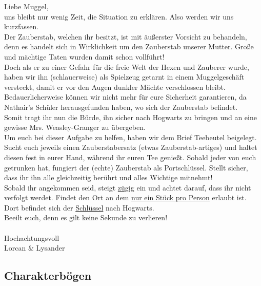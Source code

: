 \documentclass[]{scrartcl}
\begin{document}
{\calligra \large
	
Liebe Muggel,\\

uns bleibt nur wenig Zeit, die Situation zu erklären. Also werden wir uns kurzfassen.\\

Der Zauberstab, welchen ihr besitzt, ist mit äußerster Vorsicht zu behandeln, denn es handelt sich in Wirklichkeit um den Zauberstab unserer Mutter. Große und mächtige Taten wurden damit schon vollführt!\\

Doch als er zu einer Gefahr für die freie Welt der Hexen und Zauberer wurde, haben wir ihn (schlauerweise) als Spielzeug getarnt in einem Muggelgeschäft versteckt, damit er vor den Augen dunkler Mächte verschlossen bleibt. Bedauerlicherweise können wir nicht mehr für eure Sicherheit garantieren, da Nathair’s Schüler herausgefunden haben, wo sich der Zauberstab befindet.\\

Somit tragt ihr nun die Bürde, ihn sicher nach Hogwarts zu bringen und an eine gewisse Mrs. Weasley-Granger zu übergeben.\\

Um euch bei dieser Aufgabe zu helfen, haben wir dem Brief Teebeutel beigelegt. Sucht euch jeweils einen Zauberstabersatz (etwas Zauberstab-artiges) und haltet diesen fest in eurer Hand, während ihr euren Tee genießt. Sobald jeder von euch getrunken hat, fungiert der (echte) Zauberstab als Portschlüssel. Stellt sicher, dass ihr ihn alle gleichzeitig berührt und alles Wichtige mitnehmt!\\

Sobald ihr angekommen seid, steigt \underline{zügig} ein und achtet darauf, dass ihr nicht verfolgt werdet. Findet den Ort an dem \underline{nur ein Stück pro Person} erlaubt ist. Dort befindet sich der \underline{Schlüssel} nach Hogwarts.\\

Beeilt euch, denn es gilt keine Sekunde zu verlieren!\\

~\\

Hochachtungsvoll\\
Lorcan \& Lysander
}

\newpage

\subsection{Charakterbögen}
\end{document}
